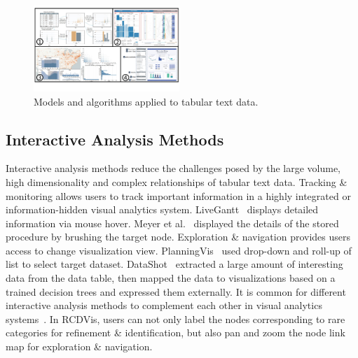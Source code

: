 \documentclass[a4paper,fleqn]{cas-dc}
\begin{document}
\begin{figure}[pos=h]
	\centering
	\includegraphics[width=0.49\textwidth]{Images/tabulartextdata2.pdf}
	\vspace{-3em}
	\caption{Models and algorithms applied to tabular text data.}
	\label{fig:tabulartextdata2}
	\vspace{-1.5em}
\end{figure}

\subsection{Interactive Analysis Methods}
Interactive analysis methods reduce the challenges posed by the large volume, high dimensionality and complex relationships of tabular text data.
Tracking \& monitoring allows users to track important information in a highly integrated or information-hidden visual analytics system.
LiveGantt~\cite{Jo2014} displays detailed information via mouse hover. Meyer et al.~\cite{Meyer2013} displayed the details of the stored procedure by brushing the target node.
Exploration \& navigation provides users access to change visualization view. PlanningVis~\cite{sun2019planningvis} used drop-down and roll-up of list to select target dataset.
DataShot~\cite{wang2019datashot} extracted a large amount of interesting data from the data table, then mapped the data to visualizations based on a trained decision trees and expressed them externally.
It is common for different interactive analysis methods to complement each other in visual analytics systems~\cite{Qian2022,sun2019planningvis,Fellow2017}.
In RCDVis, users can not only label the nodes corresponding to rare categories for refinement \& identification, but also pan and zoom the node link map for exploration \& navigation.
\end{document}
